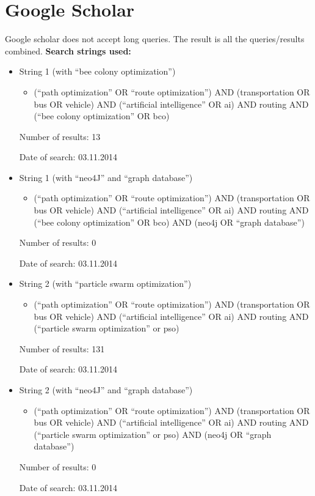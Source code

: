 \section{Google Scholar}
\par Google scholar does not accept long queries. The result is all the queries/results combined.
\textbf{Search strings used:}
\begin{itemize}
\item String 1 (with ``bee colony optimization'')
\begin{itemize}
\item (``path optimization'' OR ``route optimization'') AND (transportation OR bus OR vehicle) AND (``artificial intelligence'' OR ai) AND routing AND (``bee colony optimization'' OR bco)
\end{itemize}
\par
Number of results: 13
\par
Date of search: 03.11.2014
\end{itemize}
\begin{itemize}
\item String 1 (with ``neo4J'' and ``graph database'')
\begin{itemize}
\item (``path optimization'' OR ``route optimization'') AND (transportation OR bus OR vehicle) AND (``artificial intelligence'' OR ai) AND routing AND (``bee colony optimization'' OR bco) AND (neo4j OR ``graph database'')
\end{itemize}
\par
Number of results: 0
\par
Date of search: 03.11.2014
\end{itemize}
\begin{itemize}
\item String 2 (with ``particle swarm optimization'')
\begin{itemize}
\item (``path optimization'' OR ``route optimization'') AND (transportation OR bus OR vehicle) AND (``artificial intelligence'' OR ai) AND routing AND (``particle swarm optimization'' or pso)
\end{itemize}
\par
Number of results: 131
\par
Date of search: 03.11.2014
\end{itemize}
\begin{itemize}
\item String 2 (with ``neo4J'' and ``graph database'')
\begin{itemize}
\item (``path optimization'' OR ``route optimization'') AND (transportation OR bus OR vehicle) AND (``artificial intelligence'' OR ai) AND routing AND (``particle swarm optimization'' or pso) AND (neo4j OR ``graph database'')
\end{itemize}
\par
Number of results: 0
\par
Date of search: 03.11.2014
\end{itemize}

